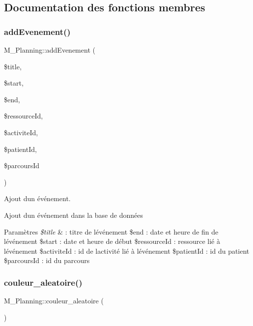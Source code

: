 \subsection{Documentation des fonctions membres}
\mbox{\label{class_m___planning_abafbb98badd73ecbd019d9a4c15cd477}} 
\subsubsection{\texorpdfstring{add\+Evenement()}{addEvenement()}}
{\footnotesize\ttfamily M\+\_\+\+Planning\+::add\+Evenement (\begin{DoxyParamCaption}\item[{}]{\$title,  }\item[{}]{\$start,  }\item[{}]{\$end,  }\item[{}]{\$ressource\+Id,  }\item[{}]{\$activite\+Id,  }\item[{}]{\$patient\+Id,  }\item[{}]{\$parcours\+Id }\end{DoxyParamCaption})}



Ajout d\textquotesingle{}un événement. 

Ajout d\textquotesingle{}un événement dans la base de données 
\begin{DoxyParams}{Paramètres}
{\em \$title} & \+: titre de l\textquotesingle{}événement \$end \+: date et heure de fin de l\textquotesingle{}événement \$start \+: date et heure de début \$ressource\+Id \+: ressource lié à l\textquotesingle{}événement \$activite\+Id \+: id de l\textquotesingle{}activité lié à l\textquotesingle{}événement \$patient\+Id \+: id du patient \$parcours\+Id \+: id du parcours \\
\hline
\end{DoxyParams}
\mbox{\label{class_m___planning_a63ae0c258ad2fb178f4b3c75a10eb347}} 
\subsubsection{\texorpdfstring{couleur\+\_\+aleatoire()}{couleur\_aleatoire()}}
{\footnotesize\ttfamily M\+\_\+\+Planning\+::couleur\+\_\+aleatoire (\begin{DoxyParamCaption}{ }\end{DoxyParamCaption})}



